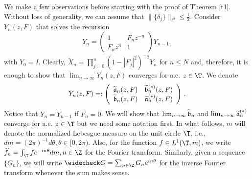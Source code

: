 \documentclass[twoside,a4paper]{amsart}
\def\le{\leqslant}
\theoremstyle{remark}
\numberwithin{equation}{section}
\begin{document}
We make a few observations before starting with the proof of Theorem \ref{t1}. Without loss of generality, we can assume that $\|\{\delta_j\}\|_{\ell^2}\le \frac 12$. Consider $Y_n(z,F)$ that solves the recursion
\begin{equation}\label{rec8}
Y_n= 
\left(\begin{array}{cc}
1& \overline{F_n}z^{-n}\\
F_n z^n &1
\end{array}\right) Y_{n-1}, 
\end{equation}
with $Y_0=I$. Clearly, 
$\widetilde X_n=\prod_{j=0}^n(1-|F_j|^2)^{-\frac 12}Y_n$ for $n\le N$ and, therefore, it is enough to show that $\lim_{n\to\infty} Y_n(z,F)$ converges for a.e. $z\in \T$. We denote
\[
Y_n(z,F)=:\left(\begin{array}{cc}
\widetilde{\frak{a}}_n(z,F)& \widetilde{\frak{b}}^{(*)}_n(z,F)\\
\widetilde{\frak{b}}_n(z,F) &\widetilde{\frak{a}}^{(*)}_n(z,F)
\end{array}\right)\,.
\]
Notice that $Y_{n}=Y_{n-1}$ if $F_n=0$. We will show that $\lim_{n\to\infty}\widetilde{\frak{b}}_n$ and $\lim_{n\to\infty}\widetilde{\frak{a}}_n^{(*)}$ converge for a.e. $z\in \T$ but we need some notation first.
In what follows, $m$ will denote the normalized Lebesgue measure on the unit circle $\T$, i.e., $dm=(2\pi)^{-1}d\theta, \theta\in [0,2\pi)$. Also, for the function $f\in L^1(\T,m)$, we write $\widehat f_n=\int_\T fe^{- in\theta}dm, n\in \Z$ for the Fourier transform. Similarly, given a sequence $\{G_n\}$, we will write $\widecheck G=\sum_{n\in \Z} G_ne^{in\theta}$ for the inverse Fourier transform whenever the sum makes sense. 
\end{document}
